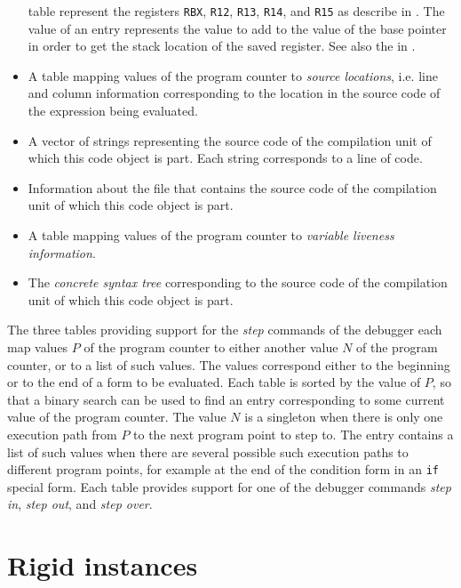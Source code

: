 \begin{itemize}
  table represent the registers \texttt{RBX}, \texttt{R12},
  \texttt{R13}, \texttt{R14}, and \texttt{R15} as describe in
  .  The value of an entry
  represents the value to add to the value of the base pointer in order
  to get the stack location of the saved register.
  See also the  in 
  .
\item A table mapping values of the program counter to \emph{source
  locations}, i.e. line and column information corresponding to the
  location in the source code of the expression being evaluated.
\item A vector of strings representing the source code of the
  compilation unit of which this code object is part.  Each string
  corresponds to a line of code.
\item Information about the file that contains the source code of the
  compilation unit of which this code object is part.
\item A table mapping values of the program counter to \emph{variable
  liveness information}.
\item The \emph{concrete syntax tree} corresponding to the source code
  of the compilation unit of which this code object is part.
\end{itemize}

The three tables providing support for the \emph{step} commands of the
debugger each map values $P$ of the program counter to either
another value $N$ of the program counter, or to a list of such values.
The values correspond either to the beginning or to the end of a form
to be evaluated.  Each table is sorted by the value of $P$, so that a
binary search can be used to find an entry corresponding to some
current value of the program counter.  The value $N$ is a singleton
when there is only one execution path from $P$ to the next program
point to step to.  The entry contains a list of such values when there
are several possible such execution paths to different program points,
for example at the end of the condition form in an \texttt{if} special
form.  Each table provides support for one of the debugger commands
\emph{step in}, \emph{step out}, and \emph{step over}.

\section{Rigid instances}
\label{sec-data-representation-rigid-instances}

